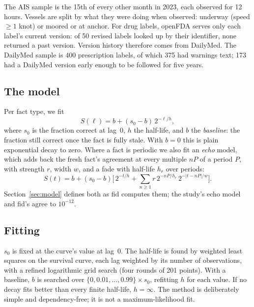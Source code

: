 The AIS sample is the 15th of every other month in 2023, each observed for
12 hours. Vessels are split by what they were doing when observed:
underway (speed $\geq 1$ knot) or moored or at anchor.
For drug labels, openFDA serves only each label's current version: of 50
revised labels looked up by their identifier, none returned a past version.
Version history therefore comes from DailyMed.
The DailyMed sample is 400 prescription labels, of which 375 had warnings
text; 173 had a DailyMed version early enough to be followed for five
years.

\subsection{The model}

Per fact type, we fit
\begin{equation}\label{eq:decay}
  S(\ell) = b + (s_0 - b)\, 2^{-\ell/h},
\end{equation}
where $s_0$ is the fraction correct at lag~0, $h$ the half-life, and $b$ the
\emph{baseline}: the fraction still correct once the fact is fully stale.
With $b = 0$ this is plain exponential decay to zero. Where a fact is
periodic we also fit an \emph{echo} model, which adds back the fresh fact's
agreement at every multiple $nP$ of a period $P$, with strength $r$, width
$w$, and a fade with half-life $h_r$ over periods:
\begin{equation}\label{eq:echo}
  S(t) = b + (s_0 - b)\Big[\, 2^{-t/h} + \sum_{n \geq 1} r\, 2^{-nP/h_r}\, 2^{-|t - nP|/w} \Big].
\end{equation}
Section~\ref{sec:model} defines both as fid computes them; the study's echo
model and fid's agree to $10^{-12}$.

\subsection{Fitting}

$s_0$ is fixed at the curve's value at lag~0. The half-life is found by
weighted least squares on the survival curve, each lag weighted by its
number of observations, with a refined logarithmic grid search (four
rounds of 201 points). With a baseline, $b$ is searched over
$\{0, 0.01, \ldots, 0.99\} \times s_0$, refitting $h$ for each value. If no
decay fits better than every finite half-life, $h = \infty$. The method is
deliberately simple and dependency-free; it is not a maximum-likelihood
fit.

